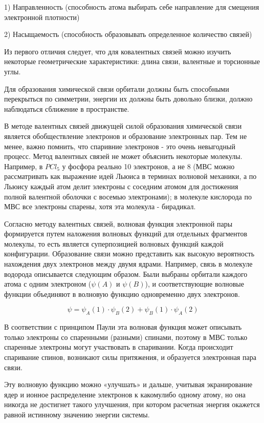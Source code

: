 \documentclass[14pt,a4paper]{scrartcl}
\begin{document}
1) Направленность  (способность атома выбирать себе направление
для смещения электронной плотности)

2) Насыщаемость (способность образовывать определенное
количество связей)

Из первого отличия следует, что для ковалентных связей можно
изучить некоторые геометрические характеристики: длина связи,
валентные и торсионные углы.

Для образования химической связи орбитали должны быть
способными перекрыться по симметрии, энергии их должны быть
довольно близки, должно наблюдаться сближение в пространстве.

В методе валентных связей движущей силой образования химической
связи является обобществление электронов и образование
электронных пар. Тем не менее, важно помнить, что спаривние
электронов - это очень невыгодный процесс. Метод валентных связей
не может объяснить некоторые молекулы. Например, в $PCl_5$ у
фосфора реально 10 электронов, а не 8 (МВС можно рассматривать как
выражение идей Льюиса в терминах волновой механики, а по
Льюису каждый атом делит электроны с соседним атомом для
достижения полной валентной оболочки с восемью электронами); в
молекуле кислорода по МВС все электроны спарены, хотя эта
молекула - бирадикал.

 Согласно методу валентных связей, волновая
функция электронной пары формируется путем наложения волновых
функций для отдельных фрагментов молекулы, то есть является
суперпозицией волновых функций каждой конфигурации.
Образование связи можно представить как высокую вероятность
нахождения двух электронов между двумя ядрами. Например, связь в
молекуле водорода описывается следующим образом. Были выбраны
орбитали каждого атома с одним электроном ($\psi(A)$ и $\psi(B)$), и
соответствующие волновые функции объединяют в волновую
функцию одновременно двух электронов.

$$\psi = \psi_A(1)\cdot\psi_B(2) + \psi_B(1)\cdot\psi_A(2)$$
 
 В соответствии с принципом Паули эта волновая функция может
описывать только электроны со спаренными (разными) спинами,
поэтому в МВС только спаренные электроны могут участвовать в
спаривании. Когда происходит спаривание спинов, возникают силы
притяжения, и образуется электронная пара связи.

Эту волновую функцию можно «улучшать» и дальше, учитывая
экранирование ядер и ионное распределение электронов к какомулибо одному атому, но она никогда не достигнет такого улучшения,
при котором расчетная энергия окажется равной истинному
значению энергии системы.
\end{document}
